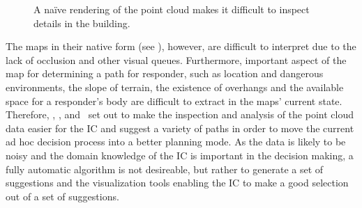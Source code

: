 \begin{figure}
\centering
{}
\caption{A na\"ive rendering of the point cloud makes it difficult to inspect details in the building.}
\label{contributions:usar:map:pointcloud}
\end{figure}

\noindent The maps in their native form (see ), however, are difficult to interpret due to the lack of occlusion and other visual queues.  Furthermore, important aspect of the map for determining a path for responder, such as location and dangerous environments, the slope of terrain, the existence of overhangs and the available space for a responder's body are difficult to extract in the maps' current state.  Therefore, \paperVMV, \paperSSRR, and \paperCGF\ set out to make the inspection and analysis of the  point cloud data easier for the IC and suggest a variety of paths in order to move the current ad hoc decision process into a better planning mode.  As the data is likely to be noisy and the domain knowledge of the IC is important in the decision making, a fully automatic algorithm is not desireable, but rather to generate a set of suggestions and the visualization tools enabling the IC to make a good selection out of a set of suggestions.


